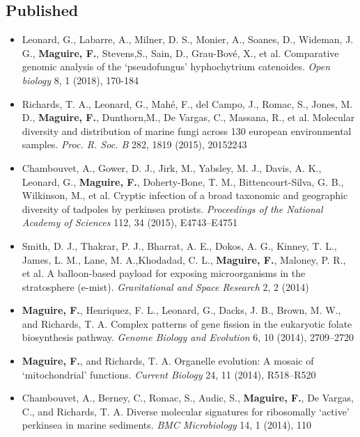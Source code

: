 \documentclass[10pt,a4paper,sans]{moderncv}        %
\begin{document}
\subsection{Published}
\begin{itemize}
\item Leonard, G., Labarre, A., Milner, D. S., Monier, A., Soanes, D., Wideman, J. G., \textbf{Maguire, F.}, Stevens,S., Sain, D., Grau-Bové, X., et al. Comparative genomic analysis of the ‘pseudofungus’ hyphochytrium catenoides. \textit{Open biology} 8, 1 (2018), 170-184
    \item Richards, T. A., Leonard, G., Mahé, F., del Campo, J., Romac, S., Jones, M. D., \textbf{Maguire, F.}, Dunthorn,M., De Vargas, C., Massana, R., et al. Molecular diversity and distribution of marine fungi across 130 european environmental samples. \textit{Proc. R. Soc. B} 282, 1819 (2015), 20152243
    \item Chambouvet, A., Gower, D. J., Jirk, M., Yabsley, M. J., Davis, A. K., Leonard, G., \textbf{Maguire, F.}, Doherty-Bone, T. M., Bittencourt-Silva, G. B., Wilkinson, M., et al. Cryptic infection of a broad taxonomic and geographic diversity of tadpoles by perkinsea protists. \textit{Proceedings of the National Academy of Sciences} 112, 34 (2015), E4743–E4751
    \item Smith, D. J., Thakrar, P. J., Bharrat, A. E., Dokos, A. G., Kinney, T. L., James, L. M., Lane, M. A.,Khodadad, C. L., \textbf{Maguire, F.}, Maloney, P. R., et al. A balloon-based payload for exposing microorganisms in the stratosphere (e-mist). \textit{Gravitational and Space Research} 2, 2 (2014)
    \item \textbf{Maguire, F.}, Henriquez, F. L., Leonard, G., Dacks, J. B., Brown, M. W., and Richards, T. A. Complex patterns of gene fission in the eukaryotic folate biosynthesis pathway. \textit{Genome Biology and Evolution} 6, 10 (2014), 2709–2720
    \item \textbf{Maguire, F.}, and Richards, T. A. Organelle evolution: A mosaic of `mitochondrial' functions. \textit{Current Biology} 24, 11 (2014), R518–R520
    \item Chambouvet, A., Berney, C., Romac, S., Audic, S., \textbf{Maguire, F.}, De Vargas, C., and Richards, T. A. Diverse molecular signatures for ribosomally `active' perkinsea in marine sediments. \textit{BMC Microbiology} 14, 1 (2014), 110
\end{itemize}
\end{document}
